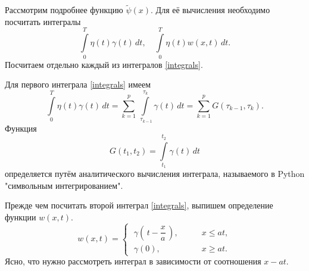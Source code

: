 \documentclass{article}
\renewcommand{\le}{\leqslant}
\renewcommand{\ge}{\geqslant}
\theoremstyle{definition}
\begin{document}
Рассмотрим подробнее функцию $\widetilde{\psi}(x)$. Для её вычисления необходимо посчитать 
интегралы
\begin{equation} \label{integrals}
	\int\limits_0^T \eta(t)\gamma(t) \,dt, \quad \int\limits_0^T \eta(t)w(x,t) \,dt.
\end{equation}
Посчитаем отдельно каждый из интегралов \eqref{integrals}.

Для первого интеграла \eqref{integrals} имеем
\begin{equation} \label{int_eta_gamma}
	\int\limits_0^T \eta(t)\gamma(t) \,dt = \sum\limits_{k = 1}^p \int\limits_{\;\tau_{k - 1}}^{\tau_k} \gamma(t) \,dt =
	\sum\limits_{k = 1}^p G(\tau_{k - 1}, \tau_k).
\end{equation}
Функция
\begin{equation} \label{int_gamma}
	G(t_1, t_2) = \int\limits_{t_1}^{t_2} \gamma(t) \,dt
\end{equation}
определяется путём аналитического вычисления интеграла, называемого в Python "символьным интегрированием".

Прежде чем посчитать второй интеграл \eqref{integrals}, выпишем определение функции $w(x,t)$.
\begin{equation*}
w(x,t) = 
	\begin{cases}
		\; \gamma\left(\,t - \dfrac{x}{a}\,\right), & \qquad x \le at, \\[3mm]
		\; \gamma(0), & \qquad x \ge at.
	\end{cases}
\end{equation*}
Ясно, что нужно рассмотреть интеграл в зависимости от соотношения $x - at$.
\end{document}
